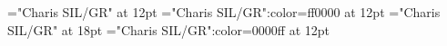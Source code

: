 \documentclass[a4paper]{article}
\begin{document}
\pagestyle{plain}
\sloppy
\setlength{\parfillskip}{0pt plus 1fil}
\font\main="Charis SIL/GR" at 12pt
\font\divmain="Charis SIL/GR":color=ff0000 at 12pt
\font\headermain="Charis SIL/GR" at 18pt
\font\spanmain="Charis SIL/GR":color=0000ff at 12pt

\mbox{} 
\newpage 
\newpage 
\setcounter{page}{1} 
\pagestyle{fancy} 



\end{document}
